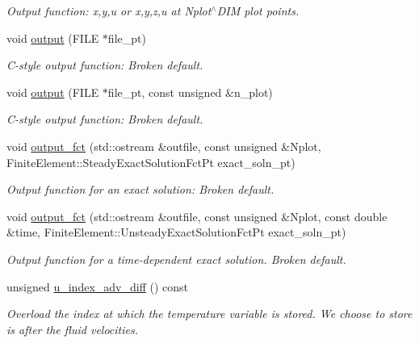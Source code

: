 \begin{DoxyCompactItemize}
\begin{DoxyCompactList}\small\item\em Output function\+: x,y,u or x,y,z,u at Nplot$^\wedge$\+D\+IM plot points. \end{DoxyCompactList}\item 
void \hyperlink{classoomph_1_1RefineableBuoyantQCrouzeixRaviartElement_a90579086f991da7fbaf7d92b29abf994}{output} (F\+I\+LE $\ast$file\+\_\+pt)
\begin{DoxyCompactList}\small\item\em C-\/style output function\+: Broken default. \end{DoxyCompactList}\item 
void \hyperlink{classoomph_1_1RefineableBuoyantQCrouzeixRaviartElement_a650e1b0428cd160c72dbc3deda287b26}{output} (F\+I\+LE $\ast$file\+\_\+pt, const unsigned \&n\+\_\+plot)
\begin{DoxyCompactList}\small\item\em C-\/style output function\+: Broken default. \end{DoxyCompactList}\item 
void \hyperlink{classoomph_1_1RefineableBuoyantQCrouzeixRaviartElement_a9f9feaf2d6003f2328741de2987fd0d1}{output\+\_\+fct} (std\+::ostream \&outfile, const unsigned \&Nplot, Finite\+Element\+::\+Steady\+Exact\+Solution\+Fct\+Pt exact\+\_\+soln\+\_\+pt)
\begin{DoxyCompactList}\small\item\em Output function for an exact solution\+: Broken default. \end{DoxyCompactList}\item 
void \hyperlink{classoomph_1_1RefineableBuoyantQCrouzeixRaviartElement_aa1eaab23a14039a18701b5666629b5bc}{output\+\_\+fct} (std\+::ostream \&outfile, const unsigned \&Nplot, const double \&time, Finite\+Element\+::\+Unsteady\+Exact\+Solution\+Fct\+Pt exact\+\_\+soln\+\_\+pt)
\begin{DoxyCompactList}\small\item\em Output function for a time-\/dependent exact solution. Broken default. \end{DoxyCompactList}\item 
unsigned \hyperlink{classoomph_1_1RefineableBuoyantQCrouzeixRaviartElement_ac6a973ee5e4d7425db2e7f9a259bab46}{u\+\_\+index\+\_\+adv\+\_\+diff} () const
\begin{DoxyCompactList}\small\item\em Overload the index at which the temperature variable is stored. We choose to store is after the fluid velocities. \end{DoxyCompactList}\item 

\end{DoxyCompactItemize}
